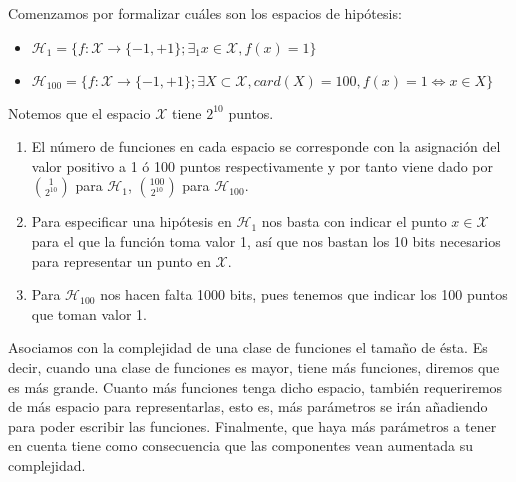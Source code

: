 \documentclass[11pt,leqno]{article}
\theoremstyle{definition}
\begin{document}
\begin{solucion} 

	Comenzamos por formalizar cuáles son los espacios de hipótesis:
	\begin{itemize}
		\item $\mathcal{H}_1 = \{f:\mathcal{X} \rightarrow \{-1, +1\}; \exists_1 x \in \mathcal{X}, f(x)=1 \} $
		\item $\mathcal{H}_{100} = \{f:\mathcal{X} \rightarrow \{-1, +1\}; \exists X \subset \mathcal{X}, card(X)=100, f(x)=1 \Leftrightarrow x \in X \} $
	\end{itemize}
	
	Notemos que el espacio $\mathcal{X}$ tiene $2^{10}$ puntos.
	
	\begin{enumerate}[a]

	\item El número de funciones en cada espacio se corresponde con la asignación del valor positivo a 1 ó 100 puntos respectivamente y por tanto viene dado por $\binom{1}{2^{10}}$ para $\mathcal{H}_1$, $\binom{100}{2^{10}}$ para $\mathcal{H}_{100}$.
	\item Para especificar una hipótesis en $\mathcal{H}_1$ nos basta con indicar el punto $x \in \mathcal{X}$ para el que la función toma valor 1, así que nos bastan los 10 bits necesarios para representar un punto en $\mathcal{X}$. 
	\item Para $\mathcal{H}_{100}$ nos hacen falta 1000 bits, pues tenemos que indicar los 100 puntos que toman valor 1.
	\end{enumerate}
	
	Asociamos con la complejidad de una clase de funciones el tamaño de ésta. Es decir, cuando una clase de funciones es mayor, tiene más funciones, diremos que es más grande. Cuanto más funciones tenga dicho espacio, también requeriremos de más espacio para representarlas, esto es, más parámetros se irán añadiendo para poder escribir las funciones. Finalmente, que haya más parámetros a tener en cuenta tiene como consecuencia que las componentes vean aumentada su complejidad.
	
	
\end{solucion}
\end{document}
